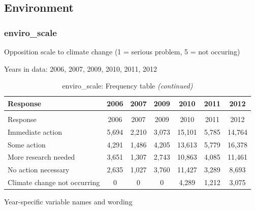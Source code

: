 \documentclass[
  12pt]{article}
\begin{document}
\hypertarget{environment}{%
\subsection{Environment}\label{environment}}

\hypertarget{enviro_scale}{%
\subsubsection{enviro\_scale}\label{enviro_scale}}

Opposition scale to climate change (1 = serious problem, 5 = not
occuring)

Years in data: 2006, 2007, 2009, 2010, 2011,
2012\begingroup\fontsize{10}{12}\selectfont

\begin{longtable}[t]{lcccccc}
\caption{\label{tab:unnamed-chunk-5}enviro\_scale: Frequency table}\\
\toprule
Response & 2006 & 2007 & 2009 & 2010 & 2011 & 2012\\
\midrule
\endfirsthead
\caption[]{enviro\_scale: Frequency table \textit{(continued)}}\\
\toprule
Response & 2006 & 2007 & 2009 & 2010 & 2011 & 2012\\
\midrule
\endhead

\endfoot
\bottomrule
\endlastfoot
Immediate action & 5,694 & 2,210 & 3,073 & 15,101 & 5,785 & 14,764\\
Some action & 4,291 & 1,486 & 4,205 & 13,613 & 5,779 & 16,378\\
More research needed & 3,651 & 1,307 & 2,743 & 10,863 & 4,085 & 11,461\\
No action necessary & 2,635 & 1,027 & 3,760 & 11,427 & 3,289 & 8,693\\
Climate change not occurring & 0 & 0 & 0 & 4,289 & 1,212 & 3,075\\*
\end{longtable}
\endgroup{}

Year-specific variable names and
wording\begingroup\fontsize{11}{13}\selectfont
\end{document}
